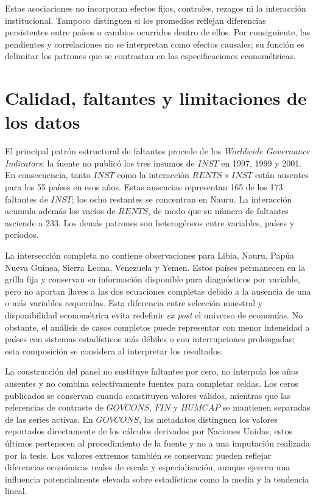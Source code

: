 \documentclass[../../TFM.tex]{subfiles}
\begin{document}
	Estas asociaciones no incorporan efectos fijos, controles, rezagos ni la
	interacción institucional. Tampoco distinguen si los promedios reflejan
	diferencias persistentes entre países o cambios ocurridos dentro de ellos.
	Por consiguiente, las pendientes y correlaciones no se interpretan como
	efectos causales; su función es delimitar los patrones que se contrastan en
	las especificaciones econométricas.

	\section{Calidad, faltantes y limitaciones de los datos}
	\label{sec:calidad-faltantes-limitaciones}

	El principal patrón estructural de faltantes procede de los
	\textit{Worldwide Governance Indicators}: la fuente no publicó los tres
	insumos de $INST$ en 1997, 1999 y 2001. En consecuencia, tanto $INST$ como la
	interacción $RENTS\times INST$ están ausentes para los 55 países en esos
	años. Estas ausencias representan 165 de los 173 faltantes de $INST$; los
	ocho restantes se concentran en Nauru. La interacción acumula además los
	vacíos de $RENTS$, de modo que su número de faltantes asciende a 233. Los
	demás patrones son heterogéneos entre variables, países y períodos.

	La intersección completa no contiene observaciones para Libia, Nauru, Papúa
	Nueva Guinea, Sierra Leona, Venezuela y Yemen. Estos países permanecen en la
	grilla fija y conservan su información disponible para diagnósticos por
	variable, pero no aportan llaves a las dos ecuaciones completas debido a la
	ausencia de una o más variables requeridas. Esta diferencia entre selección
	muestral y disponibilidad econométrica evita redefinir \textit{ex post} el
	universo de economías. No obstante, el análisis de casos completos puede
	representar con menor intensidad a países con sistemas estadísticos más
	débiles o con interrupciones prolongadas; esta composición se considera al
	interpretar los resultados.

	La construcción del panel no sustituye faltantes por cero, no interpola los
	años ausentes y no combina selectivamente fuentes para completar celdas. Los
	ceros publicados se conservan cuando constituyen valores válidos, mientras
	que las referencias de contraste de $GOVCONS$, $FIN$ y $HUMCAP$ se mantienen
	separadas de las series activas. En $GOVCONS$, los metadatos distinguen los
	valores reportados directamente de los cálculos derivados por Naciones
	Unidas; estos últimos pertenecen al procedimiento de la fuente y no a una
	imputación realizada por la tesis. Los valores extremos también se conservan:
	pueden reflejar diferencias económicas reales de escala y especialización,
	aunque ejercen una influencia potencialmente elevada sobre estadísticas
	como la media y la tendencia lineal.
\end{document}
